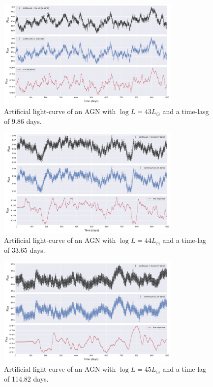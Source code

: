 \documentclass[letterpaper, oneside]{article}
\begin{document}
\begin{figure}[h]
	\centering
	\includegraphics[width=0.8\textwidth]{../lc_plots/art_lcs_logL43.pdf}
	\caption{Artificial light-curve of an AGN with $\log L = 43 L_{\odot}$ and a time-lasg of 9.86 days.}
	\label{fig:art_lcs_L43}
\end{figure}

\begin{figure}[p]
	\centering
	\includegraphics[width=0.8\textwidth]{../lc_plots/art_lcs_logL44.pdf}
	\caption{Artificial light-curve of an AGN with $\log L = 44 L_{\odot}$ and a time-lag of 33.65 days.}
	\label{fig:art_lcs_L44}
\end{figure}

\begin{figure}[p]
	\centering
	\includegraphics[width=0.8\textwidth]{../lc_plots/art_lcs_logL45.pdf}
	\caption{Artificial light-curve of an AGN with $\log L = 45 L_{\odot}$ and a time-lag of 114.82 days.}
	\label{fig:art_lcs_L45}
\end{figure}
\end{document}
